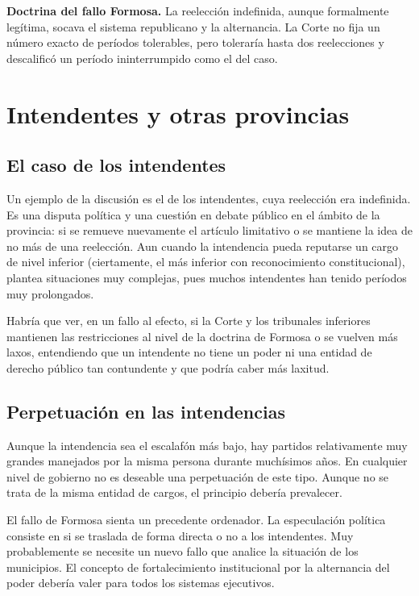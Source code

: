 \documentclass[12pt,oneside]{book}
\begin{document}
\begin{important}
\textbf{Doctrina del fallo Formosa.} La reelección indefinida, aunque formalmente legítima, socava el sistema republicano y la alternancia. La Corte no fija un número exacto de períodos tolerables, pero toleraría hasta dos reelecciones y descalificó un período ininterrumpido como el del caso.
\end{important}

\section{Intendentes y otras provincias}

\subsection{El caso de los intendentes}

Un ejemplo de la discusión es el de los intendentes, cuya reelección era indefinida. Es una disputa política y una cuestión en debate público en el ámbito de la provincia: si se remueve nuevamente el artículo limitativo o se mantiene la idea de no más de una reelección. Aun cuando la intendencia pueda reputarse un cargo de nivel inferior (ciertamente, el más inferior con reconocimiento constitucional), plantea situaciones muy complejas, pues muchos intendentes han tenido períodos muy prolongados.

Habría que ver, en un fallo al efecto, si la Corte y los tribunales inferiores mantienen las restricciones al nivel de la doctrina de Formosa o se vuelven más laxos, entendiendo que un intendente no tiene un poder ni una entidad de derecho público tan contundente y que podría caber más laxitud.

\subsection{Perpetuación en las intendencias}

Aunque la intendencia sea el escalafón más bajo, hay partidos relativamente muy grandes manejados por la misma persona durante muchísimos años. En cualquier nivel de gobierno no es deseable una perpetuación de este tipo. Aunque no se trata de la misma entidad de cargos, el principio debería prevalecer.


El fallo de Formosa sienta un precedente ordenador. La especulación política consiste en si se traslada de forma directa o no a los intendentes. Muy probablemente se necesite un nuevo fallo que analice la situación de los municipios. El concepto de fortalecimiento institucional por la alternancia del poder debería valer para todos los sistemas ejecutivos.
\end{document}
